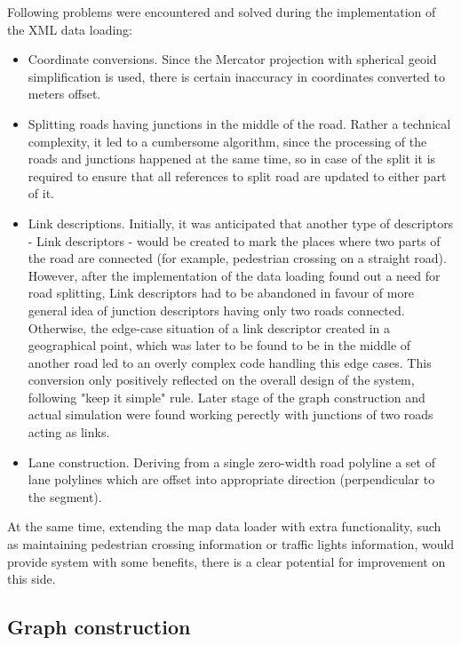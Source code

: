 Following problems were encountered and solved during the implementation of the XML data loading:
\begin{itemize}
    \item Coordinate conversions. Since the Mercator projection with spherical geoid simplification is used, there is certain inaccuracy in coordinates converted to meters offset.
    \item Splitting roads having junctions in the middle of the road. Rather a technical complexity, it led to a cumbersome algorithm, since the processing of the roads and junctions happened at the same time, so in case of the split it is required to ensure that all references to split road are updated to either part of it.
    \item Link descriptions. Initially, it was anticipated that another type of descriptors - Link descriptors - would be created to mark the places where two parts of the road are connected (for example, pedestrian crossing on a straight road). However, after the implementation of the data loading found out a need for road splitting, Link descriptors had to be abandoned in favour of more general idea of junction descriptors having only two roads connected. Otherwise, the edge-case situation of a link descriptor created in a geographical point, which was later to be found to be in the middle of another road led to an overly complex code handling this edge cases. This conversion only positively reflected on the overall design of the system, following "keep it simple" rule. Later stage of the graph construction and actual simulation were found working perectly with junctions of two roads acting as links.
    \item Lane construction. Deriving from a single zero-width road polyline a set of lane polylines which are offset into appropriate direction (perpendicular to the segment).
\end{itemize}

At the same time, extending the map data loader with extra functionality, such as maintaining pedestrian crossing information or traffic lights information, would provide system with some benefits, there is a clear potential for improvement on this side.

\subsection{Graph construction}

